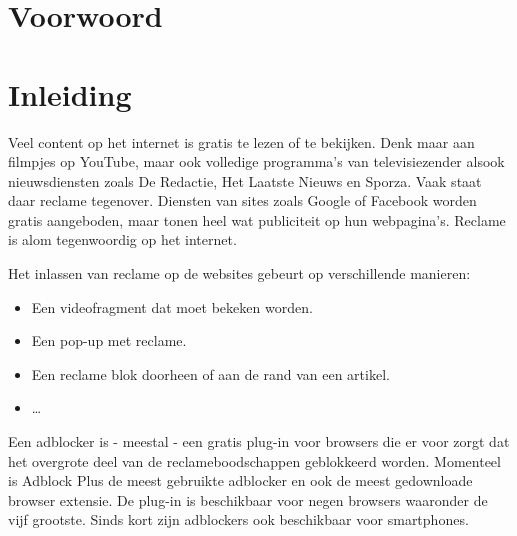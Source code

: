 \documentclass[pdftex,a4paper,12pt,twoside]{report}
\begin{document}
\begin{abstract}

\end{abstract}

\chapter*{Voorwoord}
\label{ch:voorwoord}



\tableofcontents



\chapter{Inleiding}
\label{ch:inleiding}

Veel content op het internet is gratis te lezen of te bekijken. Denk maar aan filmpjes op YouTube, maar ook volledige programma’s van televisiezender alsook nieuwsdiensten zoals De Redactie, Het Laatste Nieuws en Sporza. Vaak staat daar reclame tegenover. Diensten van sites zoals Google of Facebook worden gratis aangeboden, maar tonen heel wat publiciteit op hun webpagina’s. Reclame is alom tegenwoordig op het internet.

Het inlassen van reclame op de websites gebeurt op verschillende manieren:

\begin{itemize}
	\item Een videofragment dat moet bekeken worden.

\item Een pop-up met reclame.

\item Een reclame blok doorheen of aan de rand van een artikel.

 \item …
\end{itemize}

Een adblocker is - meestal - een gratis plug-in voor browsers die er voor zorgt dat het overgrote deel van de reclameboodschappen geblokkeerd worden. Momenteel is Adblock Plus de meest gebruikte adblocker en ook de meest gedownloade browser extensie. De plug-in is beschikbaar voor negen browsers waaronder de vijf grootste. Sinds kort zijn adblockers ook beschikbaar voor smartphones.
\end{document}
